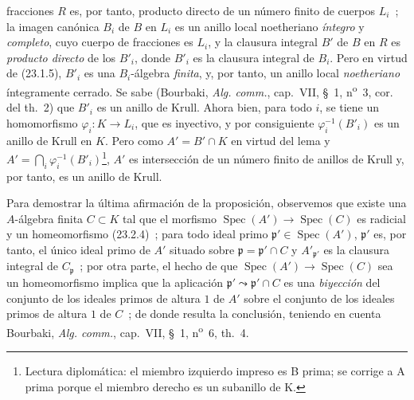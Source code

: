 fracciones $R$ es, por tanto, producto directo de un número finito de cuerpos $L_i$~;
la imagen canónica $B_i$ de $B$ en $L_i$ es un anillo local noetheriano
\emph{íntegro} y \emph{completo}, cuyo cuerpo de fracciones es $L_i$, y la
clausura integral $B'$ de $B$ en $R$ es \emph{producto directo} de los
$B'_i$, donde $B'_i$ es la clausura integral de $B_i$. Pero en virtud de
(23.1.5), $B'_i$ es una $B_i$-álgebra \emph{finita}, y, por tanto, un anillo local
\emph{noetheriano} íntegramente cerrado. Se sabe (Bourbaki,
\emph{Alg. comm.}, cap.~VII, §~1, n\textsuperscript{o}~3, cor. del th.~2) que
$B'_i$ es un anillo de Krull. Ahora bien, para todo $i$, se tiene un homomorfismo
$\varphi_i:K\to L_i$, que es inyectivo, y por consiguiente
$\varphi_i^{-1}(B'_i)$ es un anillo de Krull en $K$. Pero como
$A'=B'\cap K$ en virtud del lema y
$A'=\bigcap_i\varphi_i^{-1}(B'_i)$\footnote{Lectura diplomática: el miembro izquierdo impreso es B prima; se corrige a A prima porque el miembro derecho es un subanillo de K.}, $A'$ es intersección de un número finito
de anillos de Krull y, por tanto, es un anillo de Krull.

Para demostrar la última afirmación de la proposición, observemos que existe una
$A$-álgebra finita $C\subset K$ tal que el morfismo
$\operatorname{Spec}(A')\to\operatorname{Spec}(C)$ es radicial y un
homeomorfismo (23.2.4)~; para todo ideal primo
$\mathfrak p'\in\operatorname{Spec}(A')$, $\mathfrak p'$ es, por tanto, el único
ideal primo de $A'$ situado sobre $\mathfrak p=\mathfrak p'\cap C$ y
$A'_{\mathfrak p'}$ es la clausura integral de $C_{\mathfrak p}$~; por otra parte,
el hecho de que $\operatorname{Spec}(A')\to\operatorname{Spec}(C)$ sea un
homeomorfismo implica que la aplicación
$\mathfrak p'\leadsto\mathfrak p'\cap C$ es una \emph{biyección} del conjunto de los
ideales primos de altura $1$ de $A'$ sobre el conjunto de los ideales primos de
altura $1$ de $C$~; de donde resulta la conclusión, teniendo en cuenta Bourbaki,
\emph{Alg. comm.}, cap.~VII, §~1, n\textsuperscript{o}~6, th.~4.

